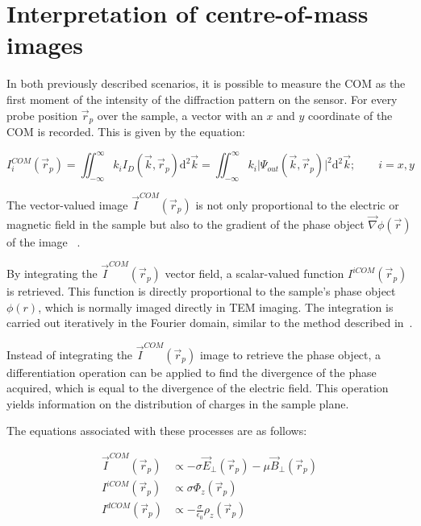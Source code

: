 \section{Interpretation of centre-of-mass images}
%
In both previously described scenarios, it is possible to measure the COM as the first moment of the intensity of the diffraction pattern on the sensor. For every probe position $\vec{r}_p$ over the sample, a vector with an $x$ and $y$ coordinate of the COM is recorded. This is given by the equation:

\begin{equation}
    I^{COM}_{i} (\vec{r}_p) = \iint_{-\infty}^{\infty} k_{i} I_D(\vec{k}, \vec{r}_p) \mathrm{d}^2\vec{k} = \iint_{-\infty}^{\infty}k_i \vert \Psi_{out}(\vec{k},\vec{r}_p)\vert^2 \mathrm{d}^2 \vec{k}; \qquad i = x,y
    \label{eq:com_int}
\end{equation}

The vector-valued image $\vec{I}^{COM}(\vec{r}_p)$ is not only proportional to the electric or magnetic field in the sample but also to the gradient of the phase object $\vec{\nabla}\phi(\vec{r})$ of the image~ \cite{lazicPhaseContrastSTEM2016}.

By integrating the $\vec{I}^{COM}(\vec{r}_p)$ vector field, a scalar-valued function $I^{iCOM}(\vec{r}_p)$ is retrieved. 
%
This function is directly proportional to the sample's phase object $\phi(r)$, which is normally imaged directly in TEM imaging. 
%
The integration is carried out iteratively in the Fourier domain, similar to the method described in~\cite{varnavidesIterativePhaseRetrieval2023}.

Instead of integrating the $\vec{I}^{COM}(\vec{r}_p)$ image to retrieve the phase object, a  differentiation operation can be applied to find the divergence of the phase acquired, which is equal to the divergence of the electric field. This operation yields information on the distribution of charges in the sample plane.

The equations associated with these processes are as follows:

\begin{align}
    \vec{I}^{COM}(\vec{r}_p) &\propto -\sigma\vec{E}_{\perp}(\vec{r}_p) - \mu \vec{B}_{\perp}(\vec{r}_p)\\
    I^{iCOM}(\vec{r}_p) &\propto \sigma \Phi_z(\vec{r}_p)\\
    I^{dCOM}(\vec{r}_p) &\propto -\frac{\sigma}{\epsilon_0}\rho_z(\vec{r}_p) 
\end{align}


